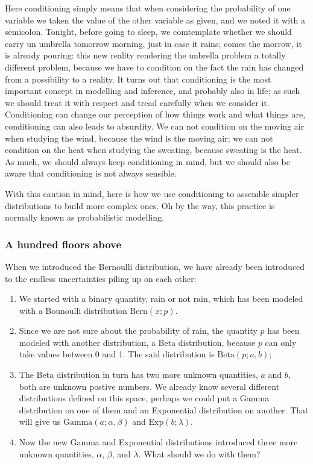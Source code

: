 \documentclass[11pt]{article}
\begin{document}
Here conditioning simply means that when considering the probability of one variable we taken the value of the other variable as given, and we noted it with a semicolon. Tonight, before going to sleep, we comtemplate whether we should carry un umbrella tomorrow morning, just in case it rains; comes the morrow, it is already pouring: this new reality rendering the unbrella problem a totally different problem, because we have to condition on the fact the rain has changed from a possibility to a reality. It turns out that conditioning is the most important concept in modelling and inference, and probably also in life; as such we should treat it with respect and tread carefully when we consider it. Conditioning can change our perception of how things work and what things are, conditioning can also leads to absurdity. We can not condition on the moving air when studying the wind, because the wind is the moving air; we can not condition on the heat when studying the sweating, because sweating is the heat. As much, we should always keep conditioning in mind, but we should also be aware that conditioning is not always sensible.

With this caution in mind, here is how we use conditioning to assemble simpler distributions to build more complex ones. Oh by the way, this practice is normally known as probabilistic modelling.

\subsubsection{A hundred floors above}
\label{sec:org8ef145a}

When we introduced the Bernoulli distribution, we have already been introduced to the endless uncertainties piling up on each other:

\begin{enumerate}
\item We started with a binary quantity, rain or not rain, which has been modeled with a Bounoulli distribution \(\text{Bern} (x; p)\).
\item Since we are not sure about the probability of rain, the quantity \(p\) has been modeled with another distribution, a Beta distribution, because \(p\) can only take values between 0 and 1. The said distribution is \(\text{Beta} (p; a, b)\);
\item The Beta distribution in turn has two more unknown quantities, \(a\) and \(b\), both are unknown postive numbers. We already know several different distributions defined on this space, perhaps we could put a Gamma distribution on one of them and an Exponential distribution on another. That will give us \(\text{Gamma} (a; \alpha, \beta)\) and \(\text{Exp} (b; \lambda)\).
\item Now the new Gamma and Exponential distributions introduced three more unknown quantities, \(\alpha\), \(\beta\), and \(\lambda\). What should we do with them?
\end{enumerate}
\end{document}
